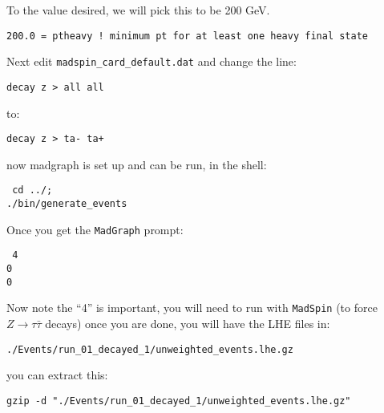 To the value desired, we will pick this to be 200 GeV.
\begin{center}
    \begin{minipage}{0.7\textwidth}
        {\tt 200.0  = ptheavy   ! minimum pt for at least one heavy final state}
    \end{minipage}
\end{center}
Next edit {\tt madspin\_card\_default.dat} and change the line:
\begin{center}
    \begin{minipage}{0.7\textwidth}
        {\tt decay z > all all}
    \end{minipage}
\end{center}
to:
\begin{center}
    \begin{minipage}{0.7\textwidth}
        {\tt decay z > ta- ta+}
    \end{minipage}
\end{center}
now madgraph is set up and can be run, in the shell:
\begin{center}
    \begin{minipage}{0.7\textwidth}
        {\tt
            cd ../;\\
            ./bin/generate\_events
        }
    \end{minipage}
\end{center}
Once you get the {\tt MadGraph} prompt:
\begin{center}
    \begin{minipage}{0.7\textwidth}
        {\tt
            4\\
            0\\
            0
        }
    \end{minipage}
\end{center}
Now note the “4” is important, you will need to run with {\tt MadSpin}
(to force $Z {\rightarrow} {\tau} \bar{\tau}$ decays) once you are done, you will have the LHE files in:
\begin{center}
    \begin{minipage}{0.7\textwidth}
        {\tt ./Events/run\_01\_decayed\_1/unweighted\_events.lhe.gz}
    \end{minipage}
\end{center}
you can extract this:
\begin{center}
    \begin{minipage}{0.7\textwidth}
        {\tt gzip -d "./Events/run\_01\_decayed\_1/unweighted\_events.lhe.gz"}
    \end{minipage}
\end{center}

